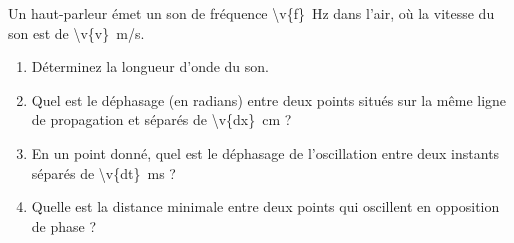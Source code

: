 Un haut-parleur émet un son de fréquence \qty{\v{f}}{Hz} dans l'air, où la vitesse du son est de \qty{\v{v}}{m/s}.

\begin{enumerate}[label=\alph*)]
    \item Déterminez la longueur d'onde du son.
    \item Quel est le déphasage (en radians) entre deux points situés sur la même ligne de propagation et séparés de \qty{\v{dx}}{cm} ?
    \item En un point donné, quel est le déphasage de l'oscillation entre deux instants séparés de \qty{\v{dt}}{ms} ?
    \item Quelle est la distance minimale entre deux points qui oscillent en opposition de phase ?
\end{enumerate}
